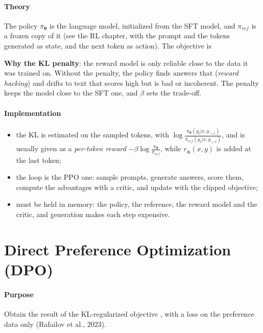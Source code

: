 \paragraph{Theory}
The policy $\pi_{\bm{\theta}}$ is the language model, initialized from the SFT model, and
$\pi_{ref}$ is a frozen copy of it (see the RL chapter, with the prompt and the tokens
generated as state, and the next token as action). The objective is
\begin{center}
\end{center}
\textbf{Why the KL penalty}: the reward model is only reliable close to the data it was
trained on. Without the penalty, the policy finds answers that 
(\emph{reward hacking}) and drifts to text that scores high but is bad or incoherent. The
penalty keeps the model close to the SFT one, and $\beta$ sets the trade-off.

\paragraph{Implementation}
\begin{itemize}
    \item the KL is estimated on the sampled tokens, with $\log\frac{\pi_{\bm{\theta}}(y_{t}|
        x,y_{<t})}{\pi_{ref}(y_{t}|x,y_{<t})}$, and is usually given as a \emph{per-token
        reward} $-\beta\log\frac{\pi_{\bm{\theta}}}{\pi_{ref}}$, while $r_{\bm{\phi}}(x,y)$
        is added at the last token;
    \item the loop is the PPO one: sample prompts, generate answers, score them, compute the
        advantages with a critic, and update with the clipped objective;
    \item {} must be held in memory: the policy, the reference, the reward
        model and the critic, and generation makes each step expensive.
\end{itemize}

\section{Direct Preference Optimization (DPO)}
\paragraph{Purpose}
Obtain the result of the KL-regularized objective ,
with a loss on the preference data only (Rafailov et al., 2023).

